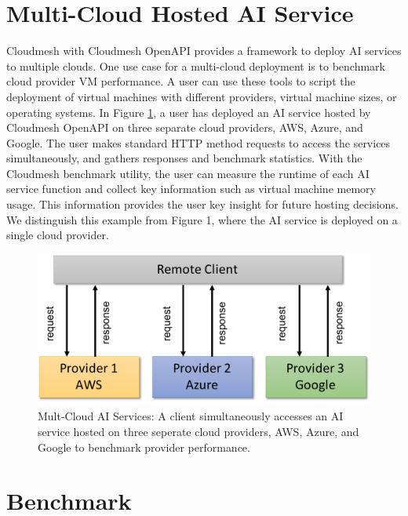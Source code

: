 \section{Multi-Cloud Hosted AI
Service}\label{multi-cloud-hosted-ai-service}

Cloudmesh with Cloudmesh OpenAPI provides a framework to deploy AI
services to multiple clouds. One use case for a multi-cloud deployment
is to benchmark cloud provider VM performance. A user can use these
tools to script the deployment of virtual machines with different
providers, virtual machine sizes, or operating systems. In Figure \ref{fig:2}, a
user has deployed an AI service hosted by Cloudmesh OpenAPI on three
separate cloud providers, AWS, Azure, and Google. The user makes
standard HTTP method requests to access the services simultaneously, and
gathers responses and benchmark statistics. With the Cloudmesh benchmark
utility, the user can measure the runtime of each AI service function
and collect key information such as virtual machine memory usage. This
information provides the user key insight for future hosting decisions.
We distinguish this example from Figure 1, where the AI service is
deployed on a single cloud provider.

\begin{figure}
\centering

\includegraphics[width=\columnwidth]{paper/images/architecture-openapi-2.pdf}

\caption{Mult-Cloud AI Services: A client simultaneously accesses an AI service hosted
on three seperate cloud providers, AWS, Azure, and Google to benchmark
provider performance.}
\label{fig:2}
\end{figure}

\section{Benchmark}
\label{sec:benchmark}


